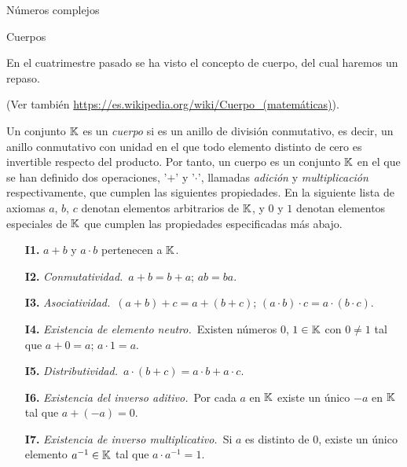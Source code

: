 
\begin{chapter}{N\'umeros complejos}\label{chap-num-compl}
    
    \begin{section}{Cuerpos}\label{seccion-cuerpos}
        
        En el cuatrimestre pasado se ha visto el concepto de cuerpo, del cual haremos un repaso.
        
        (Ver también  \href{https://es.wikipedia.org/wiki/Cuerpo\_(matemáticas)}{https://es.wikipedia.org/wiki/Cuerpo\_(matemáticas)}).
        
        
        \begin{definicion}
            Un  conjunto $\mathbb K$ es un \textit{cuerpo} si es un anillo de división conmutativo, es decir, un anillo conmutativo con unidad en el que todo elemento distinto de cero es invertible respecto del producto. Por tanto,  un cuerpo es un conjunto $\mathbb K$ en el que se han definido dos operaciones, '$+$' y '$\cdot$', llamadas \textit{adición} y \textit{multiplicación} respectivamente, que cumplen las siguientes propiedades. En la siguiente lista de axiomas $a$, $b$, $c$ denotan elementos arbitrarios de $\mathbb K$, y $0$ y $1$ denotan elementos especiales de $\mathbb K$ que cumplen las propiedades especificadas más abajo.
            \begin{enumerate}
                \item[\textbf{I1.}] $a+b$ y $a\cdot b$ pertenecen a ${\mathbb K}$.
                \item[\textbf{I2.}] {\em Conmutatividad.}\, $a+b = b+a$; $ab=ba$. 
                \item[\textbf{I3.}] {\em Asociatividad.}\, $(a+b)+c = a+(b+c)$;\; $(a\cdot b)\cdot c = a\cdot (b\cdot c)$. 
                \item[\textbf{I4.}] {\em Existencia de elemento neutro.}\, Existen números $0$, $1 \in \mathbb K$ con $0\not=1$ tal que $a+0=a$; $a\cdot 1=a$. 
                \item[\textbf{I5.}] {\em Distributividad.}\, $a\cdot (b+c)=a\cdot b+a\cdot c$. 
                \item[\textbf{I6.}] {\em Existencia del inverso aditivo.}\, Por cada $a$ en ${\mathbb K}$ existe un único  $-a$ en ${\mathbb K}$ tal que $a+(-a)=0$. 
                \item[\textbf{I7.}] {\em Existencia de inverso multiplicativo.}\, Si $a$ es distinto de 0, existe un único elemento $a^{-1} \in \mathbb K$  tal que $a\cdot a^{-1}=1$. 
            \end{enumerate}
        \end{definicion}
        

\end{section}
\end{chapter}
